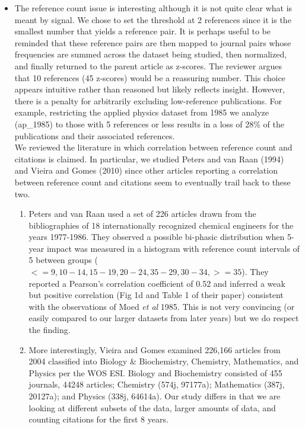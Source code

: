 \documentclass[11pt, oneside]{article}   	%
\begin{document}
\begin{itemize}
\item The reference count issue is interesting although it is not quite clear what is meant by signal. We chose to set the threshold at 2 references since it is the smallest number that yields a reference pair. It is perhaps useful to be reminded that these reference pairs are then mapped to journal pairs whose frequencies are summed across the dataset being studied, then normalized, and finally returned to the parent article as z-scores. The reviewer argues that 10 references (45 z-scores) would be a reassuring number. This choice appears intuitive rather than reasoned but likely reflects insight. However, there is a penalty for arbitrarily excluding low-reference publications. For example, restricting the applied physics dataset from 1985 we analyze (ap\_1985) to those with 5 references or less results in a loss of 28\% of the publications and their associated references. \\

\vspace{1mm}
We reviewed the literature in which correlation between reference count and citations is claimed. In particular, we studied Peters and van Raan (1994) and Vieira and Gomes (2010) since other articles reporting a correlation between reference count and citations seem to eventually trail back to these two. 
\begin{enumerate}
\item Peters and van Raan used a set of 226 articles drawn from the bibliographies of 18 internationally recognized chemical engineers for the years 1977-1986. They observed a possible bi-phasic distribution when 5-year impact was measured in a histogram with reference count intervals of 5 between groups ($<=9, 10-14, 15-19, 20-24, 35-29, 30-34, >=35$). They reported a Pearson's correlation coefficient of 0.52 and inferred a weak but positive correlation (Fig 1d and Table 1 of their paper) consistent with the observations of Moed \emph{et al} 1985. This is not very convincing (or easily compared to our larger datasets from later years) but we do respect the finding. 

\item More interestingly, Vieira and Gomes examined 226,166 articles from 2004 classified into Biology \& Biochemistry, Chemistry, Mathematics, and Physics per the WOS ESI. Biology and Biochemistry consisted of 455 journals, 44248 articles; Chemistry (574j, 97177a); Mathematics (387j, 20127a); and Physics (338j, 64614a). Our study differs in that we are looking at different subsets of the data, larger amounts of data, and counting citations for the first 8 years. 


\end{enumerate}
\end{itemize}
\end{document}
